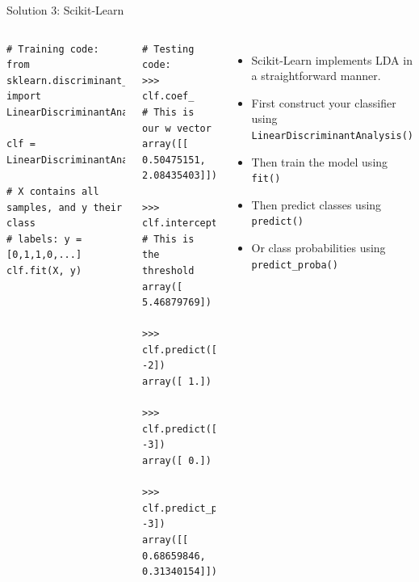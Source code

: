 \documentclass[10pt, aspectratio=169]{beamer} %
\begin{document}
\begin{frame}[fragile,allowframebreaks=0.8]
 {Solution 3: Scikit-Learn}
\begin{columns}[onlytextwidth]
\begin{lstlisting}
# Training code:
from sklearn.discriminant_analysis import LinearDiscriminantAnalysis

clf = LinearDiscriminantAnalysis()

# X contains all samples, and y their class
# labels: y = [0,1,1,0,...]
clf.fit(X, y)
\end{lstlisting}
\begin{lstlisting}
# Testing code:
>>> clf.coef_      # This is our w vector
array([[ 0.50475151,  2.08435403]])

>>> clf.intercept_ # This is the threshold
array([ 5.46879769])

>>>  clf.predict([0, -2])
array([ 1.])

>>>  clf.predict([0, -3])
array([ 0.])

>>> clf.predict_proba([0, -3])
array([[ 0.68659846,  0.31340154]])
\end{lstlisting}
\begin{itemize}
\item Scikit-Learn implements LDA in a straightforward manner.
\item First construct your classifier using \verb+LinearDiscriminantAnalysis()+
\item Then train the model using \verb+fit()+
\item Then predict classes using \verb+predict()+
\item Or class probabilities using \verb+predict_proba()+
\end{itemize}
\end{columns}
\end{frame}
\end{document}
